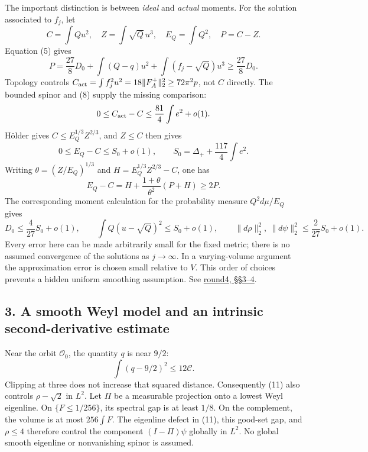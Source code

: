 \documentclass[
  english,
]{article}
\begin{document}
The important distinction is between \emph{ideal} and \emph{actual}
moments. For the solution associated to \(f_j\), let \[
 C=\int Qu^2,\quad Z=\int\sqrt Q\,u^3,\quad
 E_Q=\int Q^2,\quad P=C-Z .
\] Equation (5) gives \[
 P=\frac{27}{8}D_0+
       \int(Q-q)u^2+\int(f_j-\sqrt Q)u^3\ge\frac{27}{8}D_0.
                                                               \tag{9}
\] Topology controls
\(C_{\rm act}=\int f_j^2u^2 =18\|F_A^+\|_2^2\ge72\pi^2p\), not \(C\)
directly. The bounded spinor and (8) supply the missing comparison: \[
 0\le C_{\rm act}-C\le\frac{81}{4}\int e^2+o(1).
\] Hölder gives \(C\le E_Q^{1/3}Z^{2/3}\), and \(Z\le C\) then gives \[
 0\le E_Q-C\le S_0+o(1),\qquad
 S_0=\Delta_++\frac{117}{4}\int e^2.                       \tag{10}
\] Writing \(\theta=(Z/E_Q)^{1/3}\) and \(H=E_Q^{1/3}Z^{2/3}-C\), one
has \[
 E_Q-C=H+\frac{1+\theta}{\theta^2}(P+H)\ge2P.
\] The corresponding moment calculation for the probability measure
\(Q^2d\mu/E_Q\) gives \[
 D_0\le\frac4{27}S_0+o(1),\qquad
 \int Q(u-\sqrt Q)^2\le S_0+o(1),\qquad
 \|d\rho\|_2^2,\ \|d\psi\|_2^2\le\frac2{27}S_0+o(1).
                                                               \tag{11}
\] Every error here can be made arbitrarily small for the fixed metric;
there is no assumed convergence of the solutions as \(j\to\infty\). In a
varying-volume argument the approximation error is chosen small relative
to \(V\). This order of choices prevents a hidden uniform smoothing
assumption. See \href{../proofs/round4_rigidity.md}{round4, §§3--4}.

\hypertarget{a-smooth-weyl-model-and-an-intrinsic-second-derivative-estimate}{%
\subsection{3. A smooth Weyl model and an intrinsic second-derivative
estimate}\label{a-smooth-weyl-model-and-an-intrinsic-second-derivative-estimate}}

Near the orbit \(\mathcal O_0\), the quantity \(q\) is near \(9/2\): \[
 \int(q-9/2)^2\le12\mathcal C .
\] Clipping at three does not increase that squared distance.
Consequently (11) also controls \(\rho-\sqrt2\) in \(L^2\). Let \(\Pi\)
be a measurable projection onto a lowest Weyl eigenline. On
\(\{F\le1/256\}\), its spectral gap is at least \(1/8\). On the
complement, the volume is at most \(256\int F\). The eigenline defect in
(11), this good-set gap, and \(\rho\le4\) therefore control the
component \((I-\Pi)\psi\) globally in \(L^2\). No global smooth
eigenline or nonvanishing spinor is assumed.
\end{document}
